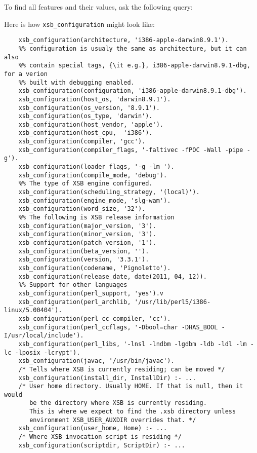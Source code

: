 \begin{description}
    To find all features and their values, ask the following query:


    Here is how {\tt xsb\_configuration} might look like:

{\small
\begin{verbatim}
    xsb_configuration(architecture, 'i386-apple-darwin8.9.1').
    %% configuration is usualy the same as architecture, but it can also
    %% contain special tags, {\it e.g.}, i386-apple-darwin8.9.1-dbg, for a verion
    %% built with debugging enabled.
    xsb_configuration(configuration, 'i386-apple-darwin8.9.1-dbg').
    xsb_configuration(host_os, 'darwin8.9.1').
    xsb_configuration(os_version, '8.9.1').
    xsb_configuration(os_type, 'darwin').
    xsb_configuration(host_vendor, 'apple').
    xsb_configuration(host_cpu,  'i386').
    xsb_configuration(compiler, 'gcc').
    xsb_configuration(compiler_flags, '-faltivec -fPOC -Wall -pipe -g').
    xsb_configuration(loader_flags, '-g -lm ').
    xsb_configuration(compile_mode, 'debug').
    %% The type of XSB engine configured.
    xsb_configuration(scheduling_strategy, '(local)').
    xsb_configuration(engine_mode, 'slg-wam').
    xsb_configuration(word_size, '32').
    %% The following is XSB release information
    xsb_configuration(major_version, '3').
    xsb_configuration(minor_version, '3').
    xsb_configuration(patch_version, '1').
    xsb_configuration(beta_version, '').
    xsb_configuration(version, '3.3.1').
    xsb_configuration(codename, 'Pignoletto').
    xsb_configuration(release_date, date(2011, 04, 12)).
    %% Support for other languages
    xsb_configuration(perl_support, 'yes').v
    xsb_configuration(perl_archlib, '/usr/lib/perl5/i386-linux/5.00404').
    xsb_configuration(perl_cc_compiler, 'cc').
    xsb_configuration(perl_ccflags, '-Dbool=char -DHAS_BOOL -I/usr/local/include').
    xsb_configuration(perl_libs, '-lnsl -lndbm -lgdbm -ldb -ldl -lm -lc -lposix -lcrypt').
    xsb_configuration(javac, '/usr/bin/javac').
    /* Tells where XSB is currently residing; can be moved */
    xsb_configuration(install_dir, InstallDir) :- ...
    /* User home directory. Usually HOME. If that is null, then it would
       be the directory where XSB is currently residing.
       This is where we expect to find the .xsb directory unless
       environment XSB_USER_AUXDIR overrides that. */
    xsb_configuration(user_home, Home) :- ...
    /* Where XSB invocation script is residing */
    xsb_configuration(scriptdir, ScriptDir) :- ...

\end{verbatim}}
\end{description}
